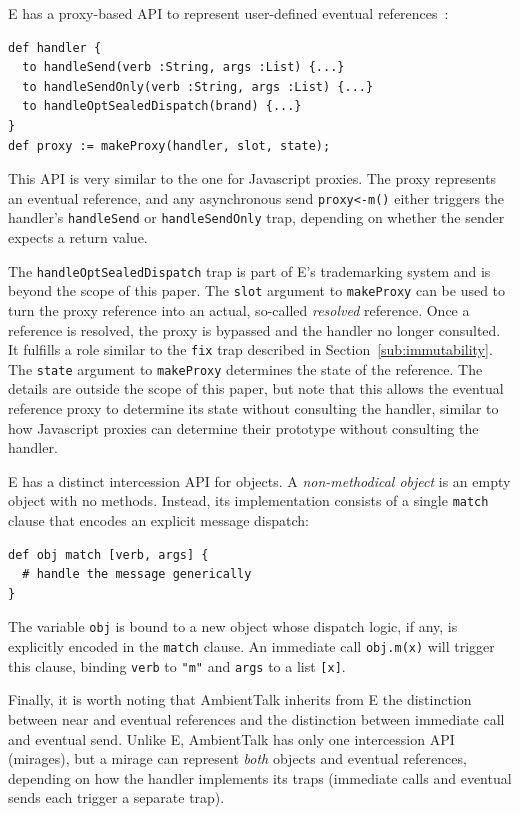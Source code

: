 \documentclass{sig-alternate}
\begin{document}
E has a proxy-based API to represent user-defined eventual references~\cite{eproxies}:

\begin{lstlisting}[]
def handler {
  to handleSend(verb :String, args :List) {...}
  to handleSendOnly(verb :String, args :List) {...}
  to handleOptSealedDispatch(brand) {...}
}
def proxy := makeProxy(handler, slot, state);
\end{lstlisting}

This API is very similar to the one for Javascript proxies. The proxy represents an eventual reference, and any asynchronous send \texttt{proxy<-m()} either triggers the handler's \texttt{handleSend} or \texttt{handleSendOnly} trap, depending on whether the sender expects a return value.

The \texttt{handleOptSealedDispatch} trap is part of E's trademarking system and is beyond the scope of this paper. The \texttt{slot} argument to \texttt{makeProxy} can be used to turn the proxy reference into an actual, so-called \emph{resolved} reference. Once a reference is resolved, the proxy is bypassed and the handler no longer consulted. It fulfills a role similar to the \texttt{fix} trap described in Section~\ref{sub:immutability}. The \texttt{state} argument to \texttt{makeProxy} determines the state of the reference. The details are outside the scope of this paper, but note that this allows the eventual reference proxy to determine its state without consulting the handler, similar to how Javascript proxies can determine their prototype without consulting the handler.

E has a distinct intercession API for objects. A \emph{non-methodical object} is an empty object with no methods. Instead, its implementation consists of a single \texttt{match} clause that encodes an explicit message dispatch:

\begin{lstlisting}
def obj match [verb, args] {
  # handle the message generically
}
\end{lstlisting}

The variable \texttt{obj} is bound to a new object whose dispatch logic, if any, is explicitly encoded in the \texttt{match} clause. An immediate call \texttt{obj.m(x)} will trigger this clause, binding \texttt{verb} to \texttt{"m"} and \texttt{args} to a list \texttt{[x]}.

Finally, it is worth noting that AmbientTalk inherits from E the distinction between near and eventual references and the distinction between immediate call and eventual send. Unlike E, AmbientTalk has only one intercession API (mirages), but a mirage can represent \emph{both} objects and eventual references, depending on how the handler implements its traps (immediate calls and eventual sends each trigger a separate trap).
\end{document}

